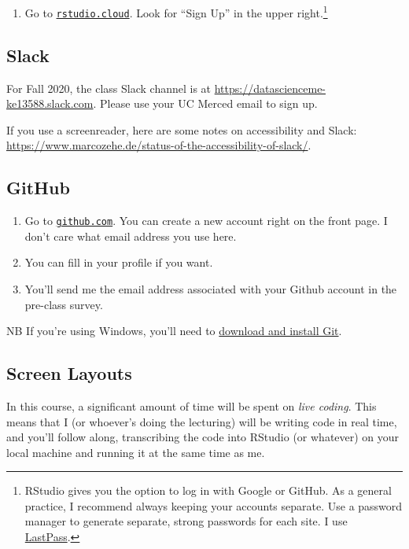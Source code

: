 \documentclass[
]{article}
\providecommand{\tightlist}{%
  \setlength{\itemsep}{0pt}\setlength{\parskip}{0pt}}
\begin{document}
\begin{enumerate}
\def\labelenumi{\arabic{enumi}.}
\tightlist
\item
  Go to \href{https://rstudio.cloud/}{\texttt{rstudio.cloud}}. Look for ``Sign Up'' in the upper right.\footnote{RStudio gives you the option to log in with Google or GitHub. As a general practice, I recommend always keeping your accounts separate. Use a password manager to generate separate, strong passwords for each site. I use \href{https://www.lastpass.com/}{LastPass}.}
\end{enumerate}

\hypertarget{slack}{%
\subsection{Slack}\label{slack}}

For Fall 2020, the class Slack channel is at \url{https://datascienceme-ke13588.slack.com}. Please use your UC Merced email to sign up.

If you use a screenreader, here are some notes on accessibility and Slack: \url{https://www.marcozehe.de/status-of-the-accessibility-of-slack/}.

\hypertarget{github}{%
\subsection{GitHub}\label{github}}

\begin{enumerate}
\def\labelenumi{\arabic{enumi}.}
\item
  Go to \href{https://github.com/}{\texttt{github.com}}. You can create a new account right on the front page. I don't care what email address you use here.
\item
  You can fill in your profile if you want.
\item
  You'll send me the email address associated with your Github account in the pre-class survey.
\end{enumerate}

NB If you're using Windows, you'll need to \href{https://gitforwindows.org/}{download and install Git}.

\hypertarget{screen-layouts}{%
\subsection{Screen Layouts}\label{screen-layouts}}

In this course, a significant amount of time will be spent on \emph{live coding}. This means that I (or whoever's doing the lecturing) will be writing code in real time, and you'll follow along, transcribing the code into RStudio (or whatever) on your local machine and running it at the same time as me.
\end{document}
